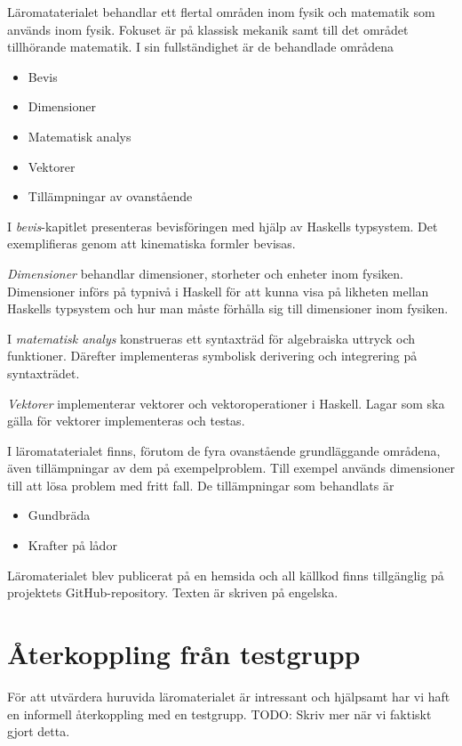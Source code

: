 \begin{binge}
Läromataterialet behandlar ett flertal områden inom fysik och matematik som används inom fysik. Fokuset är på klassisk mekanik samt till det området tillhörande matematik. I sin fullständighet är de behandlade områdena

\begin{itemize}
  \item Bevis
  \item Dimensioner
  \item Matematisk analys
  \item Vektorer
  \item Tillämpningar av ovanstående
\end{itemize}

I \textit{bevis}-kapitlet presenteras bevisföringen med hjälp av Haskells typsystem. Det exemplifieras genom att kinematiska formler bevisas.

\textit{Dimensioner} behandlar dimensioner, storheter och enheter inom fysiken. Dimensioner införs på typnivå i Haskell för att kunna visa på likheten mellan Haskells typsystem och hur man måste förhålla sig till dimensioner inom fysiken.

I \textit{matematisk analys} konstrueras ett syntaxträd för algebraiska uttryck och funktioner. Därefter implementeras symbolisk derivering och integrering på syntaxträdet.

\textit{Vektorer} implementerar vektorer och vektoroperationer i Haskell. Lagar som ska gälla för vektorer implementeras och testas.

I läromataterialet finns, förutom de fyra ovanstående grundläggande områdena, även tillämpningar av dem på exempelproblem. Till exempel används dimensioner till att lösa problem med fritt fall. De tillämpningar som behandlats är

\begin{itemize}
  \item Gundbräda
  \item Krafter på lådor
\end{itemize}

Läromaterialet blev publicerat på en hemsida\cite{LYAP} och all källkod finns tillgänglig på projektets GitHub-repository.\cite{LYAP_repo} Texten är skriven på engelska.

\section{Återkoppling från testgrupp}

För att utvärdera huruvida läromaterialet är intressant och hjälpsamt har vi
haft en informell återkoppling med en testgrupp. TODO: Skriv mer när vi
faktiskt gjort detta.

\end{binge}
